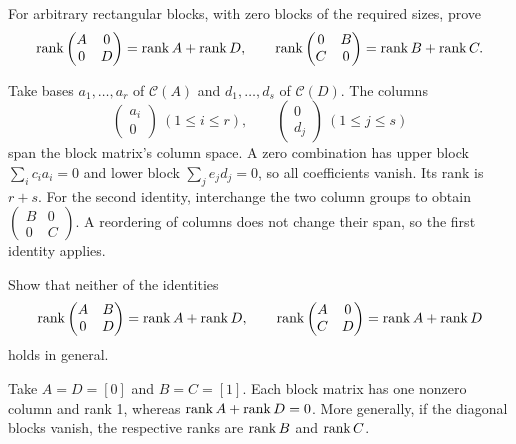 \begin{problem}\label{ex:03:block-diagonal}
For arbitrary rectangular blocks, with zero blocks of the required sizes, prove
\[
\operatorname{rank}\begin{pmatrix}A&0\\0&D\end{pmatrix}=\operatorname{rank} A+\operatorname{rank} D,
\qquad
\operatorname{rank}\begin{pmatrix}0&B\\C&0\end{pmatrix}=\operatorname{rank} B+\operatorname{rank} C.
\]
\end{problem}
\begin{solution}
Take bases \(a_1,\ldots,a_r\) of \(\mathcal C(A)\) and
\(d_1,\ldots,d_s\) of \(\mathcal C(D)\). The columns
\[
\begin{pmatrix}a_i\\0\end{pmatrix}\ (1\leqslant i\leqslant r),\qquad
\begin{pmatrix}0\\d_j\end{pmatrix}\ (1\leqslant j\leqslant s)
\]
span the block matrix's column space. A zero combination has upper block
\(\sum_i c_ia_i=0\) and lower block \(\sum_j e_jd_j=0\), so all
coefficients vanish. Its rank is \(r+s\).
For the second identity, interchange the two column groups to obtain
\(\left(\begin{smallmatrix}B&0\\0&C\end{smallmatrix}\right)\).
A reordering of columns does not change their span, so the first identity applies.
\end{solution}

\begin{problem}\label{ex:03:block-counterexample}
Show that neither of the identities
\[
\operatorname{rank}\begin{pmatrix}A&B\\0&D\end{pmatrix}=\operatorname{rank} A+\operatorname{rank} D,
\qquad
\operatorname{rank}\begin{pmatrix}A&0\\C&D\end{pmatrix}=\operatorname{rank} A+\operatorname{rank} D
\]
holds in general.
\end{problem}
\begin{solution}
Take \(A=D=[0]\) and \(B=C=[1]\).
Each block matrix has one nonzero column and rank 1, whereas
\(\operatorname{rank} A+\operatorname{rank} D=0\). More generally, if the diagonal blocks vanish,
the respective ranks are \(\operatorname{rank} B\) and \(\operatorname{rank} C\).
\end{solution}

